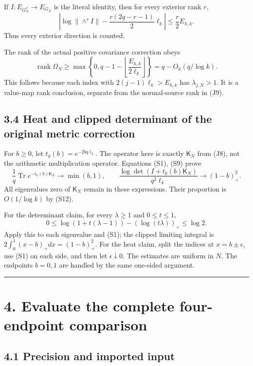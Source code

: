 If \(I:E_{G_N^J}\to E_{G_N}\) is the literal identity, then for every exterior rank \(r\), \[
 \boxed{
 \left|
 \log\|\wedge^r I\|-
 \frac{r(2q-r-1)}2\ell_k
 \right|\le\frac r2 E_{h,k}.
 } \tag{S11}
\] Thus every exterior direction is counted.

The rank of the actual positive covariance correction obeys \[
 \operatorname{rank}\Omega_N
 \ge\max\left\{0,q-1-\left\lfloor\frac{E_{h,k}}{2\ell_k}\right\rfloor\right\}
 =q-O_h(q/\log k). \tag{S12}
\] This follows because each index with \(2(j-1)\ell_k>E_{h,k}\) has \(\lambda_{j,N}>1\). It is a value-map rank conclusion, separate from the normal-source rank in (J9).

\subsection{3.4 Heat and clipped determinant of the original metric correction}\label{heat-and-clipped-determinant-of-the-original-metric-correction}

For \(b\ge0\), let \(t_k(b)=e^{-2bq\ell_k}\). The operator here is exactly \(\mathsf K_N\) from (J8), not the arithmetic multiplication operator. Equations (S1), (S9) prove \[
 \boxed{
 \frac1q\operatorname{Tr}e^{-t_k(b)\mathsf K_N}
 \longrightarrow\min(b,1),
 }\qquad
 \boxed{
 \frac{\log\det(I+t_k(b)\mathsf K_N)}{q^2\ell_k}
 \longrightarrow(1-b)_+^2.
 } \tag{S13}
\] All eigenvalues zero of \(\mathsf K_N\) remain in these expressions. Their proportion is \(O(1/\log k)\) by (S12).

For the determinant claim, for every \(\lambda\ge1\) and \(0\le t\le1\), \[
 0\le\log(1+t(\lambda-1))-(\log(t\lambda))_+\le\log2.
\] Apply this to each eigenvalue and (S1); the clipped limiting integral is \(2\int_0^1(x-b)_+dx=(1-b)_+^2\). For the heat claim, split the indices at \(x=b\pm\epsilon\), use (S1) on each side, and then let \(\epsilon\downarrow0\). The estimates are uniform in \(N\). The endpoints \(b=0,1\) are handled by the same one-sided argument.

\begin{center}\rule{0.5\linewidth}{0.5pt}\end{center}

\section{4. Evaluate the complete four-endpoint comparison}\label{evaluate-the-complete-four-endpoint-comparison}

\subsection{4.1 Precision and imported input}\label{precision-and-imported-input}


